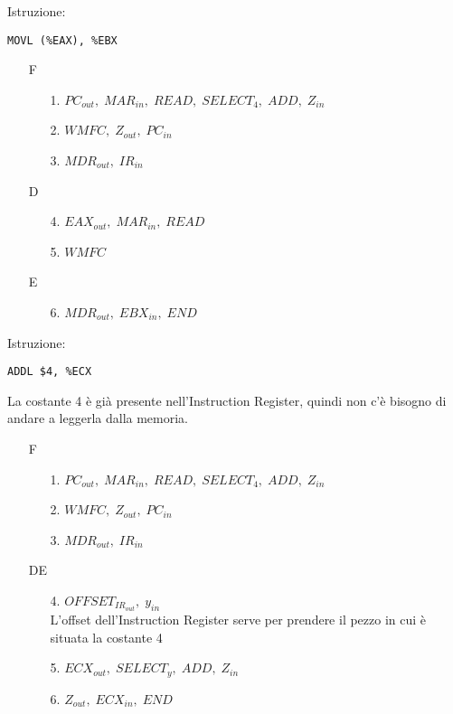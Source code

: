 \documentclass[a4paper]{article}
\theoremstyle{break}
\theoremstyle{break}
\theoremstyle{break}
\theoremstyle{break}
\begin{document}
\begin{example}
	Istruzione:
	\begin{center}
		\texttt{MOVL (\%EAX), \%EBX}
	\end{center}

	\begin{enumerate}
		\item[F]
		      \begin{enumerate}
			      \item[1.] \( PC_{out},\; MAR_{in},\; READ ,\; SELECT_4,\; ADD,\; Z_{in}\)
			      \item[2.] \( WMFC,\; Z_{out},\; PC_{in}\)
			      \item[3.] \( MDR_{out},\; IR_{in} \)
		      \end{enumerate}
		\item[D]
		      \begin{enumerate}
			      \item[4.] \( EAX_{out},\; MAR_{in},\; READ \)
			      \item[5.] \( WMFC \)
		      \end{enumerate}
		\item[E]
		      \begin{enumerate}
			      \item[6.] \( MDR_{out},\; EBX_{in},\; END \)
		      \end{enumerate}
	\end{enumerate}
\end{example}

\begin{example}
	Istruzione:
	\begin{center}
		\texttt{ADDL \$4, \%ECX}
	\end{center}

	\noindent La costante 4 è già presente nell'Instruction Register, quindi non c'è bisogno di
	andare a leggerla dalla memoria.
	\begin{enumerate}
		\item[F]
		      \begin{enumerate}
			      \item[1.] \( PC_{out},\; MAR_{in},\; READ ,\; SELECT_4,\; ADD,\; Z_{in}\)
			      \item[2.] \( WMFC,\; Z_{out},\; PC_{in}\)
			      \item[3.] \( MDR_{out},\; IR_{in} \)
		      \end{enumerate}
		\item[DE]
		      \begin{enumerate}
			      \item[4.] \( OFFSET_{IR_{out}},\; y_{in} \) \\
			            L'offset dell'Instruction Register serve per prendere il pezzo in cui è situata
			            la costante 4
			      \item[5.] \( ECX_{out},\; SELECT_{y},\;ADD,\; Z_{in} \)
			      \item[6.] \( Z_{out},\; ECX_{in},\; END \)
		      \end{enumerate}
	\end{enumerate}
\end{example}
\end{document}
